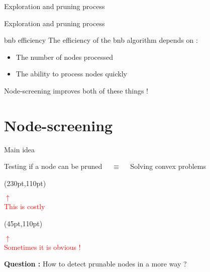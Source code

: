 \documentclass[10pt]{beamer}
\begin{document}
\begin{frame}{Exploration and pruning process}
  \begin{figure}
    \centering
    \scalebox{1}{}
  \end{figure}
\end{frame}

\begin{frame}{Exploration and pruning process}
  \begin{figure}
    \centering
    \scalebox{1}{}
  \end{figure}
\end{frame}

\begin{frame}{\gls{bnb} efficiency}
  The efficiency of the \gls{bnb} algorithm depends on :
  \begin{itemize}
    \item The number of nodes processed
    \item The ability to process nodes quickly
  \end{itemize}
  Node-screening improves both of these things !
\end{frame}

\section{Node-screening}

\begin{frame}{Main idea}

  \begin{center}
    Testing if a node can be pruned $\quad\equiv\quad$ Solving convex problems
  \end{center}
  
  \begin{textblock*}{100pt}(230pt,110pt)
    \begin{center}
      \scriptsize{\textcolor{red}{
        $\uparrow$ \\
        This is costly      
      }}
    \end{center}
  \end{textblock*}

  \begin{textblock*}{100pt}(45pt,110pt)
    \begin{center}
      \scriptsize{\textcolor{red}{
        $\uparrow$ \\
        Sometimes it is obvious !
      }}
    \end{center}
  \end{textblock*}

  \vspace*{1cm}

  \pause
  \textbf{Question :} How to detect prunable nodes in a more  way ?
\end{frame}
\end{document}
